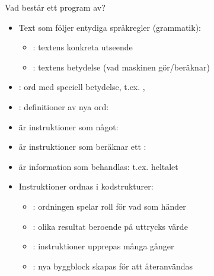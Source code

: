 \begin{Slide}{Vad består ett program av?}
\begin{itemize}
\item Text som följer entydiga språkregler (grammatik):
\begin{itemize}
\item {}: textens konkreta utseende
\item {}: textens betydelse (vad maskinen gör/beräknar)
\end{itemize}
\item {}: ord med speciell betydelse, t.ex. , 
\item {}: definitioner av nya ord: 
\item {} är instruktioner som  något: 
\item {} är instruktioner som beräknar ett : 
\item {} är information som behandlas: t.ex. heltalet 
\item Instruktioner ordnas i kodstrukturer: 
\begin{itemize}
  \item {}: ordningen spelar roll för vad som händer
  \item {}: olika resultat beroende på uttrycks värde
  \item {}: instruktioner upprepas många gånger
  \item {}: nya byggblock skapas för att återanvändas
\end{itemize}
\end{itemize}
\end{Slide}

